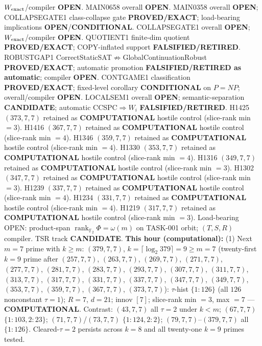 \documentclass[11pt]{article}
\begin{document}
$W_{\rm exact}$/compiler \textbf{OPEN}.
MAIN0658 overall \textbf{OPEN}.
MAIN0358 overall \textbf{OPEN}; COLLAPSEGATE1 class-collapse gate \textbf{PROVED/EXACT};
load-bearing implications \textbf{OPEN}/\textbf{CONDITIONAL}.
COLLAPSEGATE1 overall \textbf{OPEN}; $W_{\rm exact}$/compiler \textbf{OPEN}.
QUOTIENT1 finite-dim quotient \textbf{PROVED/EXACT}; COPY-inflated support \textbf{FALSIFIED/RETIRED}.
ROBUSTGAP1 CorrectStaticSAT$\not\Rightarrow$GlobalContinuationRobust \textbf{PROVED/EXACT};
automatic promotion \textbf{FALSIFIED/RETIRED as automatic}; compiler \textbf{OPEN}.
CONTGAME1 classification \textbf{PROVED/EXACT}; fixed-level corollary \textbf{CONDITIONAL} on $P=NP$;
overall/compiler \textbf{OPEN}.
LOCALSEM1 overall \textbf{OPEN}; semantic-separation \textbf{CANDIDATE}; automatic CCSPC$\Rightarrow W_i$
\textbf{FALSIFIED/RETIRED}.
H1425 $(373,7,7)$ retained as \textbf{COMPUTATIONAL} hostile control (slice-rank min $=3$).
H1416 $(367,7,7)$ retained as \textbf{COMPUTATIONAL} hostile control (slice-rank min $=4$).
H1346 $(359,7,7)$ retained as \textbf{COMPUTATIONAL} hostile control (slice-rank min $=4$).
H1330 $(353,7,7)$ retained as \textbf{COMPUTATIONAL} hostile control (slice-rank min $=4$).
H1316 $(349,7,7)$ retained as \textbf{COMPUTATIONAL} hostile control (slice-rank min $=3$).
H1302 $(347,7,7)$ retained as \textbf{COMPUTATIONAL} hostile control (slice-rank min $=3$).
H1239 $(337,7,7)$ retained as \textbf{COMPUTATIONAL} hostile control (slice-rank min $=4$).
H1234 $(331,7,7)$ retained as \textbf{COMPUTATIONAL} hostile control (slice-rank min $=4$).
H1219 $(317,7,7)$ retained as \textbf{COMPUTATIONAL} hostile control (slice-rank min $=3$).
Load-bearing OPEN: product-span $\operatorname{rank}_{\mathbb F_2}\Phi=\omega(m)$ on TASK-001 orbit;
$(T,S,R)$ compiler. TSR track \textbf{CANDIDATE}.
\textbf{This hour (computational):}
(1) Next $m{=}7$ prime with $k{\ge}m$: $(379,7,7)$, $k{=}\lceil\log_2 379\rceil=9{\ge}m{=}7$
(twenty-first $k{=}9$ prime after $(257,7,7)$, $(263,7,7)$, $(269,7,7)$, $(271,7,7)$, $(277,7,7)$, $(281,7,7)$, $(283,7,7)$, $(293,7,7)$, $(307,7,7)$, $(311,7,7)$, $(313,7,7)$, $(317,7,7)$, $(331,7,7)$, $(337,7,7)$, $(347,7,7)$, $(349,7,7)$, $(353,7,7)$, $(359,7,7)$, $(367,7,7)$, $(373,7,7)$):
$\tau$-hist $\{1{:}126\}$ (all $126$ nonconstant $\tau{=}1$); $R{=}7$, $d{=}21$; innov $[7]$;
slice-rank min $=3$, max $=7$ --- \textbf{COMPUTATIONAL}.
Contrast: $(43,7,7)$ all $\tau{=}2$ under $k{<}m$; $(67,7,7)$ $\{1{:}103,2{:}23\}$;
$(71,7,7)$/$(73,7,7)$ $\{1{:}124,2{:}2\}$; $(79,7,7)$--$(379,7,7)$ all $\{1{:}126\}$.
Cleared-$\tau{=}2$ persists across $k{=}8$ and all twenty-one $k{=}9$ primes tested.
\end{document}
